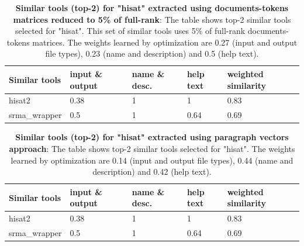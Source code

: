 \begin{table}[ht]
\begin{center}
    \begin{tabular}{|l|l|l|l|l|}
        \hline
        Similar tools   & input \& output & name \& desc. & help text & weighted similarity \\ \hline
        hisat2   & 0.38 & 1 & 1 & 0.83 \\ \hline
        srma\_wrapper & 0.5 & 1 & 0.64 & 0.69 \\ \hline
    \end{tabular}
    \end{center}
    \caption[Similar tools (top-2) for "hisat" extracted using documents-tokens matrices reduced to 5\% of full-rank]{\textbf{Similar tools (top-2) for "hisat" extracted using documents-tokens matrices reduced to 5\% of full-rank}: The table shows top-2 similar tools selected for "hisat". This set of similar tools uses 5\% of full-rank documents-tokens matrices. The weights learned by optimization are 0.27 (input and output file types), 0.23 (name and description) and 0.5 (help text).}
    \label{tab:accuracy}
\end{table}

\begin{table}[ht]
\begin{center}
    \begin{tabular}{|l|l|l|l|l|}
        \hline
        Similar tools   & input \& output & name \& desc. & help text & weighted similarity \\ \hline
        hisat2   & 0.38 & 1 & 1 & 0.83 \\ \hline
        srma\_wrapper & 0.5 & 1 & 0.64 & 0.69 \\ \hline
    \end{tabular}
    \end{center}
    \caption[Similar tools (top-2) for "hisat" extracted using paragraph vectors approach]{\textbf{Similar tools (top-2) for "hisat" extracted using paragraph vectors approach}: The table shows top-2 similar tools selected for "hisat". The weights learned by optimization are 0.14 (input and output file types), 0.44 (name and description) and 0.42 (help text).}
    \label{tab:accuracy}
\end{table}